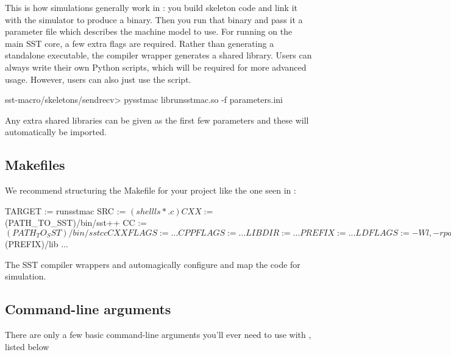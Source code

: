 This is how simulations generally work in \sstmacro: you build skeleton code and link it with the simulator to produce a binary.  
Then you run that binary and pass it a parameter file which describes the machine model to use.  For running on the main SST core, a few extra flags are required.  Rather than generating a standalone executable, the compiler wrapper generates a shared library. Users can always write their own Python scripts, which will be required for more advanced usage. However, users can also just use the  script.

\begin{ShellCmd}
sst-macro/skeletons/sendrecv> pysstmac librunsstmac.so -f parameters.ini
\end{ShellCmd}
Any extra shared libraries can be given as the first few parameters and these will automatically be imported.

\subsection{Makefiles}
\label{subsec:tutorial:makefiles}

We recommend structuring the Makefile for your project like the one seen in  :

\begin{ViFile}
TARGET := runsstmac
SRC := $(shell ls *.c) 

CXX :=      $(PATH_TO_SST)/bin/sst++
CC :=        $(PATH_TO_SST)/bin/sstcc
CXXFLAGS := ...
CPPFLAGS := ...
LIBDIR :=  ...
PREFIX :=   ...
LDFLAGS :=  -Wl,-rpath,$(PREFIX)/lib
...
\end{ViFile}
The SST compiler wrappers  and  automagically configure and map the code for simulation. 

\subsection{Command-line arguments}
\label{subsec:tutorial:cmdline}

There are only a few basic command-line arguments you'll ever need to use with \sstmacro, listed below

